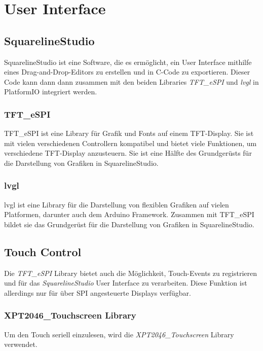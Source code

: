 \section{User Interface}
        \subsection{SquarelineStudio}
        SquarelineStudio ist eine Software, die es ermöglicht, ein 
        User Interface mithilfe eines Drag-and-Drop-Editors zu erstellen und
        in C-Code zu exportieren. Dieser Code kann dann dann zusammen mit den 
        beiden Libraries \textit{TFT\_eSPI} und \textit{lvgl} in PlatformIO
        integriert werden.

            \subsubsection{TFT\_eSPI}
            TFT\_eSPI ist eine Library für Grafik und Fonts auf einem TFT-Display.
            Sie ist mit vielen verschiedenen Controllern kompatibel und bietet
            viele Funktionen, um verschiedene TFT-Display anzusteuern.
            Sie ist eine Hälfte des Grundgerüsts für die Darstellung von Grafiken 
            in SquarelineStudio.

            \subsubsection{lvgl}
            lvgl ist eine Library für die Darstellung von flexiblen Grafiken
            auf vielen Platformen, darunter auch dem Arduino Framework.
            Zusammen mit TFT\_eSPI bildet sie das Grundgerüst für die Darstellung
            von Grafiken in SquarelineStudio.
        \subsection{Touch Control}
        Die \textit{TFT\_eSPI} Library bietet auch die Möglichkeit, Touch-Events
        zu registrieren und für das \textit{SquarelineStudio} User Interface zu
        verarbeiten. Diese Funktion ist allerdings nur für über SPI angesteuerte
        Displays verfügbar.
            \subsubsection{XPT2046\_Touchscreen Library}
            Um den Touch seriell einzulesen, wird die \textit{XPT2046\_Touchscreen}
            Library verwendet. 

